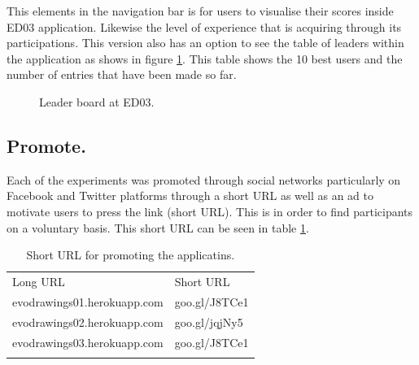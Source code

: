This elements in the navigation bar is for users to visualise their scores
inside ED03 application. Likewise the level of experience that is acquiring
through its participations. This version also has an option to see the table of
leaders within the application as shows in figure \ref{fig:leaderBoard}. This table shows the
10 best users and the number of entries that have been made so far.


\begin{figure}
\captionsetup{justification=centering,margin=2cm}
\centering
\setlength\fboxsep{0pt}
\setlength\fboxrule{0.7pt}
\caption{Leader board at ED03.}
\label{fig:leaderBoard}
\end{figure}


\subsection{Promote.}

Each of the experiments was promoted through social networks particularly on
Facebook and Twitter platforms through a short URL as well as an ad to motivate
users to press the link (short URL). This is in order to find participants on a
voluntary basis. This short URL can be seen in table \ref{tab:PromoteUrl}.

\begin{table}
\small
\caption{Short URL for promoting the applicatins.}
\label{tab:PromoteUrl}
\centering
\small
\begin{tabular}{p{5cm} p{4cm}  }
\hline\noalign{\smallskip}
 Long URL & Short URL \\
\noalign{\smallskip}\hline\noalign{\smallskip}
\small{evodrawings01.herokuapp.com } & \small{goo.gl/J8TCe1}  \\ \hline
\small{evodrawings02.herokuapp.com } & \small{goo.gl/jqjNy5}  \\ \hline
\small{evodrawings03.herokuapp.com} & \small{goo.gl/J8TCe1}  \\ \hline
\noalign{\smallskip}\hline
\end{tabular}
\end{table}


